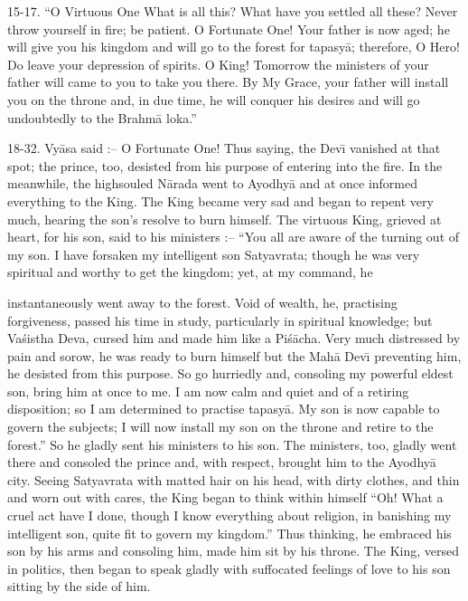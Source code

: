15-17. ``O Virtuous One What is all this? What have you settled all these? Never throw yourself in fire; be patient. O Fortunate One! Your father is now aged; he will give you his kingdom and will go to the forest for tapasy\=a; therefore, O Hero! Do leave your depression of spirits. O King! Tomorrow the ministers of your father will came to you to take you there. By My Grace, your father will install you on the throne and, in due time, he will conquer his desires and will go undoubtedly to the Brahm\=a loka.''

18-32. Vy\=asa said :-- O Fortunate One! Thus saying, the Dev\={\i} vanished at that spot; the prince, too, desisted from his purpose of entering into the fire. In the meanwhile, the highsouled N\=arada went to Ayodhy\=a and at once informed everything to the King. The King became very sad and began to repent very much, hearing the son's resolve to burn himself. The virtuous King, grieved at heart, for his son, said to his ministers :-- ``You all are aware of the turning out of my son. I have forsaken my intelligent son Satyavrata; though he was very spiritual and worthy to get the kingdom; yet, at my command, he

instantaneously went away to the forest. Void of wealth, he, practising forgiveness, passed his time in study, particularly in spiritual knowledge; but Va\'sistha Deva, cursed him and made him like a Pi\'s\=acha. Very much distressed by pain and sorow, he was ready to burn himself but the Mah\=a Dev\={\i} preventing him, he desisted from this purpose. So go hurriedly and, consoling my powerful eldest son, bring him at once to me. I am now calm and quiet and of a retiring disposition; so I am determined to practise tapasy\=a. My son is now capable to govern the subjects; I will now install my son on the throne and retire to the forest.'' So he gladly sent his ministers to his son. The ministers, too, gladly went there and consoled the prince and, with respect, brought him to the Ayodhy\=a city. Seeing Satyavrata with matted hair on his head, with dirty clothes, and thin and worn out with cares, the King began to think within himself ``Oh! What a cruel act have I done, though I know everything about religion, in banishing my intelligent son, quite fit to govern my kingdom.'' Thus thinking, he embraced his son by his arms and consoling him, made him sit by his throne. The King, versed in politics, then began to speak gladly with suffocated feelings of love to his son sitting by the side of him.

